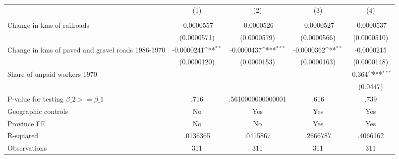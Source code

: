 {
\def\sym#1{\ifmmode^{#1}\else\(^{#1}\)\fi}
\begin{tabular}{l*{4}{c}}
\hline\hline
                &\multicolumn{1}{c}{(1)}&\multicolumn{1}{c}{(2)}&\multicolumn{1}{c}{(3)}&\multicolumn{1}{c}{(4)}\\
                &\multicolumn{1}{c}{}&\multicolumn{1}{c}{}&\multicolumn{1}{c}{}&\multicolumn{1}{c}{}\\
\hline
Change in kms of railroads&-0.0000557         &-0.0000526         &-0.0000527         &-0.0000537         \\
                &(0.0000571)         &(0.0000579)         &(0.0000566)         &(0.0000510)         \\
[1em]
Change in kms of paved and gravel roads 1986-1970&-0.0000241\sym{**} &-0.0000437\sym{***}&-0.0000362\sym{**} &-0.0000215         \\
                &(0.0000120)         &(0.0000153)         &(0.0000163)         &(0.0000148)         \\
[1em]
Share of unpaid workers 1970&                  &                  &                  &   -0.364\sym{***}\\
                &                  &                  &                  & (0.0447)         \\
\hline
P-value for testing $\beta\_{2} >= \beta\_{1}$&     .716         &.5610000000000001         &     .616         &     .739         \\
Geographic controls&       No         &      Yes         &      Yes         &      Yes         \\
Province FE     &       No         &       No         &      Yes         &      Yes         \\
R-squared       & .0136365         & .0415867         & .2666787         & .4066162         \\
Observations    &      311         &      311         &      311         &      311         \\
\hline\hline
\end{tabular}
}
